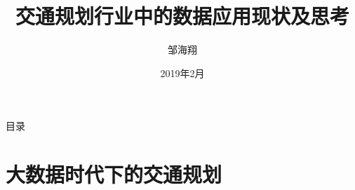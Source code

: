 \documentclass{beamerthemeMono}
\begin{document}
\title[交通规划行业中的数据应用现状及思考]%
{\heiti \xiaoerhao 交通规划行业中的数据应用现状及思考}


\author[邹海翔] %
{\xiaosihao 邹海翔}
\date{\xiaosihao 2019年2月}





\begin{frame}[plain]
  \titlepage
\end{frame}


\begin{frame}{目录}{}
   {\tableofcontents[hideallsubsections]}
\end{frame}


\section{大数据时代下的交通规划}
\end{document}
